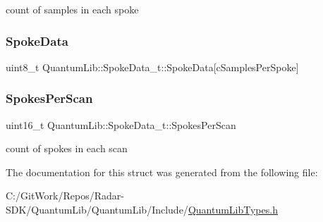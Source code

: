 count of samples in each spoke 

\mbox{\label{struct_quantum_lib_1_1_spoke_data__t_ad37442613255475db25e2abf2691ee09}} 
\subsubsection{\texorpdfstring{Spoke\+Data}{SpokeData}}
{\footnotesize\ttfamily uint8\+\_\+t Quantum\+Lib\+::\+Spoke\+Data\+\_\+t\+::\+Spoke\+Data\mbox{[}c\+Samples\+Per\+Spoke\mbox{]}}

\mbox{\label{struct_quantum_lib_1_1_spoke_data__t_abca160974e76a8a333a1927d1896fc69}} 
\subsubsection{\texorpdfstring{Spokes\+Per\+Scan}{SpokesPerScan}}
{\footnotesize\ttfamily uint16\+\_\+t Quantum\+Lib\+::\+Spoke\+Data\+\_\+t\+::\+Spokes\+Per\+Scan}



count of spokes in each scan 



The documentation for this struct was generated from the following file\+:\begin{DoxyCompactItemize}
\item 
C\+:/\+Git\+Work/\+Repos/\+Radar-\/\+S\+D\+K/\+Quantum\+Lib/\+Quantum\+Lib/\+Include/\mbox{\hyperlink{_quantum_lib_types_8h}{Quantum\+Lib\+Types.\+h}}\end{DoxyCompactItemize}
